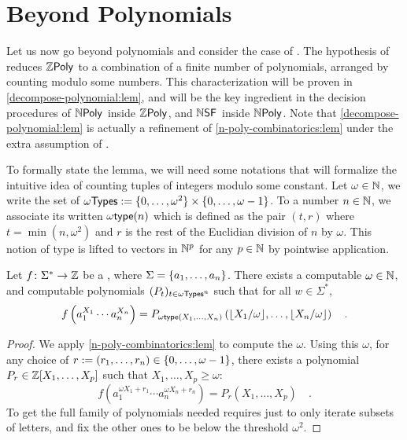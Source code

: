 \section{Beyond Polynomials}
\label{beyond-polynomials:sec}

Let us now go beyond polynomials and consider the case of 
. The hypothesis of  reduces
$\ZPoly$ to a combination of a finite number of polynomials, arranged by
counting modulo some numbers. This characterization will be proven in
\cref{decompose-polynomial:lem}, and will be the key ingredient in the decision
procedures of $\NPoly$ inside $\ZPoly$, and $\NSF$ inside $\NPoly$. Note that
\cref{decompose-polynomial:lem} is actually a refinement of
\cref{n-poly-combinatorics:lem} under the extra assumption of
. 

\AP To formally state the lemma, we will need some notations that will
formalize the intuitive idea of counting tuples of integers modulo some
constant. Let $\omega \in \mathbb{N}$, we write the set of  $\ModuloTypes[\omega] \defined \set{0, \dots, \omega^2} \times \set{0,
    \dots, \omega - 1}$. To a number $n \in \mathbb{N}$, we associate its
     written $\moduloType[\omega](n)$ which is defined as the pair
    $(t, r)$ where $t = \min (n, \omega^2)$ and $r$ is the rest of the Euclidian
    division of $n$ by $\omega$. This notion of type is lifted to vectors in
    $\mathbb{N}^p$ for any $p \in \mathbb{N}$ by pointwise application.


\begin{lemma}
    \label{decompose-polynomial:lem}
    Let $f \colon \Sigma^* \to \mathbb{Z}$ be a 
    ,
    where $\Sigma = \mathopen{\{} a_1, \dots, a_n \mathclose{\}}$.
    There exists a computable
    $\omega \in \mathbb{N}$,
    and computable 
    polynomials $\seqof{P_{t}}{t \in \ModuloTypes[\omega]^n}$
    such that for all $w \in \Sigma^*$,
    \begin{equation*}
        f\left(a_1^{X_1} \cdots a_n ^{X_n}\right) 
        = P_{\moduloType[\omega](X_1, \dots, X_n)}
        \left(
            \floor{X_1/\omega}, \dots, \floor{X_n/\omega}
        \right)
        \quad .
    \end{equation*}
\end{lemma}
\begin{proof}
    We apply
    \cref{n-poly-combinatorics:lem} to compute the $\omega$.
    Using this $\omega$,
    for any choice of
    $r \mathrel{:=} (r_1, \dots, r_n) \in \mathopen{\{} 0, \dots, \omega - 1 \mathclose{\}}$,
    there exists a polynomial $P_r \in \mathbb{Z}[X_1, \dots, X_p]$
    such that $X_1, \dots, X_p \geq \omega$:
    \begin{equation*}
        f\left(
        a_1^{\omega X_1 + r_1} \cdots a_n ^{\omega X_n + r_n}\right) 
        = P_r(X_1, \dots, X_p) \quad .
    \end{equation*}
    To get the full family of polynomials needed requires
    just to only iterate subsets of letters, and fix the other ones
    to be below the threshold $\omega^2$.
\end{proof}

